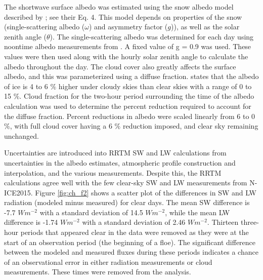 The shortwave surface albedo was estimated using the snow albedo model described by \citet{wiscombe:1980}; see their Eq. 4. This model depends on properties of the snow (single-scattering albedo ($\omega$) and asymmetry factor ($g$)), as well as the solar zenith angle ($\theta$). The single-scattering albedo was determined for each day using noontime albedo measurements from \citet{walden:2017}. A fixed value of g = 0.9 was used. These values were then used along with the hourly solar zenith angle to calculate the albedo throughout the day. The cloud cover also greatly affects the surface albedo, and this was parameterized using a diffuse fraction. \citet{key:2001} states that the albedo of ice is 4 to 6 $\%$ higher under cloudy skies than clear skies with a range of 0 to 15 $\%$. Cloud fraction for the two-hour period surrounding the time of the albedo calculation was used to determine the percent reduction required to account for the diffuse fraction. Percent reductions in albedo were scaled linearly from 6 to 0 $\%$, with full cloud cover having a 6 $\%$ reduction imposed, and clear sky remaining unchanged.

Uncertainties are introduced into RRTM SW and LW calculations from uncertainties in the albedo estimates, atmospheric profile construction and interpolation, and the various measurements. Despite this, the RRTM calculations agree well with the few clear-sky SW and LW measurements from N-ICE2015. Figure \ref{fig:ch_f2} shows a scatter plot of the differences in SW and LW radiation (modeled minus measured) for clear days. The mean SW difference is -7.7 $W m^{-2}$ with a standard deviation of 14.5 $W m^{-2}$, while the mean LW difference is -1.74 $W m^{-2}$ with a standard deviation of 2.46 $W m^{-2}$. Thirteen three-hour periods that appeared clear in the data were removed as they were at the start of an observation period (the beginning of a floe). The significant difference between the modeled and measured fluxes during these periods indicates a chance of an observational error in either radiation measurements or cloud measurements. These times were removed from the analysis.

